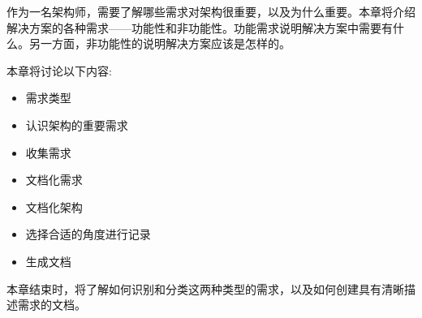 作为一名架构师，需要了解哪些需求对架构很重要，以及为什么重要。本章将介绍解决方案的各种需求——功能性和非功能性。功能需求说明解决方案中需要有什么。另一方面，非功能性的说明解决方案应该是怎样的。

本章将讨论以下内容:

\begin{itemize}
\item 需求类型
\item 认识架构的重要需求
\item 收集需求
\item 文档化需求
\item 文档化架构
\item 选择合适的角度进行记录
\item 生成文档
\end{itemize}

本章结束时，将了解如何识别和分类这两种类型的需求，以及如何创建具有清晰描述需求的文档。